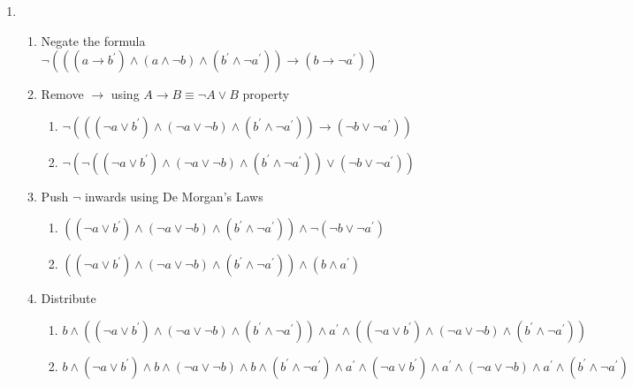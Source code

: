 \documentclass[a4paper, 14pt]{report}
\begin{document}
\begin{enumerate}

	\item \begin{enumerate}

		\item Negate the formula
			$ \neg (((a \rightarrow b^\prime) \wedge (a \wedge \neg b) \wedge (b^\prime \wedge \neg a^\prime)) \rightarrow (b \rightarrow \neg a^\prime)) $
		
		\item Remove $\rightarrow$ using $A \rightarrow B \equiv \neg A \vee B$ property

			\begin{enumerate}		
				\item $ \neg (((\neg a \vee b^\prime) \wedge (\neg a \vee \neg b) \wedge (b^\prime \wedge \neg a^\prime)) \rightarrow (\neg b \vee \neg a^\prime)) $ 
				\item $ \neg (\neg ((\neg a \vee b^\prime) \wedge (\neg a \vee \neg b) \wedge (b^\prime \wedge \neg a^\prime)) \vee (\neg b \vee \neg a^\prime)) $ 
			\end{enumerate}		

		\item Push $\neg$ inwards using De Morgan's Laws
		
			\begin{enumerate}		
				\item $ ((\neg a \vee b^\prime) \wedge (\neg a \vee \neg b) \wedge (b^\prime \wedge \neg a^\prime)) \wedge \neg (\neg b \vee \neg a^\prime) $
				\item $ ((\neg a \vee b^\prime) \wedge (\neg a \vee \neg b) \wedge (b^\prime \wedge \neg a^\prime)) \wedge (b \wedge a^\prime) $
			\end{enumerate}		

		\item Distribute

			\begin{enumerate}		
				\item $ b \wedge ((\neg a \vee b^\prime) \wedge (\neg a \vee \neg b) \wedge (b^\prime \wedge \neg a^\prime)) \wedge a^\prime \wedge  ((\neg a \vee b^\prime) \wedge (\neg a \vee \neg b) \wedge (b^\prime \wedge \neg a^\prime)) $ 
				\item $ b \wedge (\neg a \vee b^\prime) \wedge b \wedge (\neg a \vee \neg b) \wedge b \wedge (b^\prime \wedge \neg a^\prime) \wedge a^\prime \wedge (\neg a \vee b^\prime) \wedge a^\prime \wedge (\neg a \vee \neg b) \wedge a^\prime \wedge (b^\prime \wedge \neg a^\prime) $
			\end{enumerate}		


\end{enumerate}
\end{enumerate}
\end{document}
